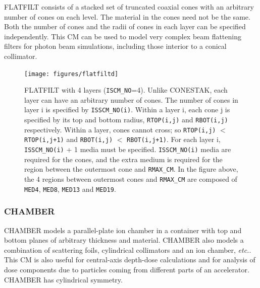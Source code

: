 \documentclass[12pt,twoside]{article}
\newcommand{\etc}{{\em etc.}}
\begin{document}
FLATFILT consists of a stacked set of truncated coaxial cones with an arbitrary
number of cones on each level.  The material in the cones need not be the same.
Both the number of cones and the radii of cones in each layer can be specified
independently.  This CM can be used to model very complex beam flattening
filters for photon beam simulations, including those interior to a conical
collimator.
\begin{figure}[h]
\begin{center}
\leavevmode
\mbox{}\hspace{0cm}
\texttt{[image: figures/flatfiltd]}
\caption[FLATFILT CM geometry]
{FLATFILT with 4 layers ({\tt ISCM\_NO}=4).  Unlike CONESTAK, each layer can
have an arbitrary number of cones.  The number of cones in layer i is
specified by {\tt ISSCM\_NO(i)}.  Within a layer i, each cone j is specified by
its top and bottom radius, {\tt RTOP(i,j)} and {\tt RBOT(i,j)} respectively.  Within
a layer, cones cannot cross; so {\tt RTOP(i,j)} $<$ {\tt RTOP(i,j+1)} and
{\tt RBOT(i,j)} $<$ {\tt RBOT(i,j+1)}.  For each layer i, {\tt ISSCM\_NO(i)} + 1 media must be
specified.  {\tt ISSCM\_NO(i)} media are required for the cones, and the extra
medium is required for the region between the outermost cone and
{\tt RMAX\_CM}.  In the figure above, the 4 regions between outermost cones and
{\tt RMAX\_CM} are composed of {\tt MED4}, {\tt MED8}, {\tt MED13} and {\tt MED19}.}
\label{fig_FLATFILTD}
\end{center}
\end{figure}


\begin{small}

\end{small}


\clearpage

\subsubsection{CHAMBER}
\label{chamber_cm}
\renewcommand{\rightmark}{CHAMBER CM}

CHAMBER models a parallel-plate ion chamber in a container with top and bottom
planes of arbitrary thickness and material. CHAMBER also
models a combination of scattering foils, cylindrical
collimators and an ion chamber, \etc. This CM is also useful for
central-axis
depth-dose calculations and for analysis of dose components due to
particles coming from different parts of an accelerator.
CHAMBER has cylindrical symmetry.
\end{document}
